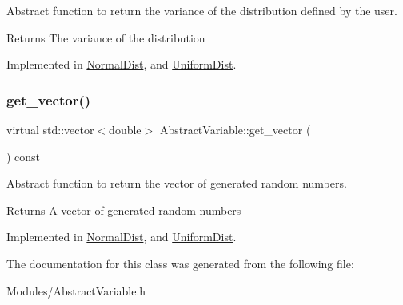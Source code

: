 Abstract function to return the variance of the distribution defined by the user. 

\begin{DoxyReturn}{Returns}
The variance of the distribution 
\end{DoxyReturn}


Implemented in \hyperlink{classNormalDist_a46bc646f126ac3c2d46bcd9ccbf01135}{Normal\+Dist}, and \hyperlink{classUniformDist_aade143a6ff9ed9a8bee2e6b9fb2fed4c}{Uniform\+Dist}.

\mbox{\label{classAbstractVariable_a0312a988d8c527d2af7615ef2fd08621}} 
\subsubsection{\texorpdfstring{get\+\_\+vector()}{get\_vector()}}
{\footnotesize\ttfamily virtual std\+::vector$<$double$>$ Abstract\+Variable\+::get\+\_\+vector (\begin{DoxyParamCaption}{ }\end{DoxyParamCaption}) const\hspace{0.3cm}{\ttfamily [pure virtual]}}



Abstract function to return the vector of generated random numbers. 

\begin{DoxyReturn}{Returns}
A vector of generated random numbers 
\end{DoxyReturn}


Implemented in \hyperlink{classNormalDist_a473e67b9d1787f6ff887f6854dbd350c}{Normal\+Dist}, and \hyperlink{classUniformDist_a60df487bfb003628e9997ebcb5aedcde}{Uniform\+Dist}.



The documentation for this class was generated from the following file\+:\begin{DoxyCompactItemize}
\item 
Modules/Abstract\+Variable.\+h\end{DoxyCompactItemize}
